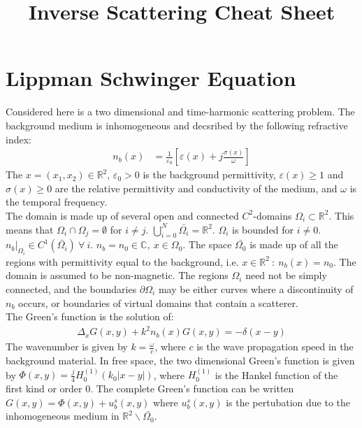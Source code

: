\documentclass[14pt]{article}
\title{Inverse Scattering Cheat Sheet}
\begin{document}
	\maketitle
	
	\section{Lippman Schwinger Equation}
		Considered here is a two dimensional and time-harmonic scattering problem.
	The background medium is inhomogeneous and decsribed by the following refractive
	index:	
		\begin{align}
			n_b(x) &= \frac{1}{\varepsilon_0}[\varepsilon(x) + j\frac{\sigma(x)}{\omega}]
		\end{align}
	The $x = (x_1,x_2) \in \mathbb{R}^2$, $\varepsilon_0 > 0$ is the background
	permittivity, $\varepsilon(x) \ge 1$ and $\sigma(x) \ge 0$ are the relative
	permittivity and conductivity of the medium, and $\omega$ is the temporal
	frequency.~\\
	
		The domain is made up of several open and connected $C^2$-domains $\Omega_i \subset \mathbb{R}^2$.
	This means that $\Omega_i \cap \Omega_j = \emptyset$ for $i \ne j$.  
	$\bigcup_{i=0}^N \bar{\Omega_i} = \mathbb{R}^2$.  $\Omega_i$ is bounded for $i \ne 0$.
	$n_b|_{\Omega_i} \in C^1(\bar{\Omega_i})~\forall~i$.  $n_b = n_0 \in \mathbb{C},
	~x \in \Omega_0$.  The space $\bar{\Omega_0}$ is made up of all the regions with
	permittivity equal to the background, i.e. $x \in \mathbb{R}^2~:~n_b(x) = n_0$.
	The domain is assumed to be non-magnetic.  The regions $\Omega_i$ need not be
	simply connected, and the boundaries $\partial \Omega_i$ may be either curves
	where a discontinuity of $n_b$ occurs, or boundaries of virtual domains that
	contain a scatterer.~\\	

		The Green's function is the solution of:
			\begin{align}
				\Delta_x G(x,y) + k^2n_b(x)G(x,y) = -\delta(x - y)
			\end{align}
	The wavenumber is given by $k = \frac{\omega}{c}$, where $c$ is the wave
	propagation speed in the background material.  In free space, the two dimensional
	Green's function is given by $\Phi(x,y) = \frac{j}{4}H_0^{(1)}(k_0|x - y|)$, 
	where $H_0^{(1)}$ is the Hankel function of the first kind or order 0.  The
	complete Green's function can be written $G(x,y) = \Phi(x,y) + u_b^s(x,y)$ 
	where $u_b^s(x,y)$ is the pertubation due to the inhomogeneous medium in
	$\mathbb{R}^2 \backslash \bar{\Omega_0}$.
\end{document}

